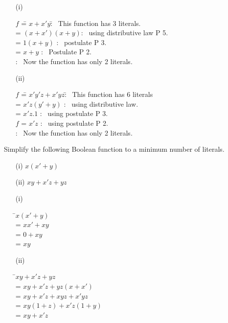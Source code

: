 \begin{solution}
\begin{itemize}
\item[(i)]
\begin{tabbing}
\phantom{AAAAAA}$f$ \== $x+x'y$\qquad\qquad \=:~ This function has 3 literals.\\[3pt]
 \>= $(x+x')(x+y)$\qquad \>:~ using distributive law P 5.\\[3pt]
 \>= $1(x+y)$ \>:~ postulate P 3.\\[3pt]
 \>= $x+y$    \>:~ Postulate P 2.\\[3pt]
 \>           \>:~ Now the function has only 2 literals.
\end{tabbing}

\item[(ii)] \begin{tabbing}
$f$ \== $x'y'z+x'yz$\qquad\qquad \=:~ This function has 6 literals\\[3pt]
    \>= $x'z(y'+y)$              \>:~ using distributive law.\\[3pt]
    \>= $x'z.1$                  \>:~ using postulate P 3.\\[3pt]
$f$ \>= $x'z$                    \>:~ using postulate P 2.\\[3pt]
    \>                           \>:~ Now the function has only 2 literals. 
\end{tabbing}
\end{itemize}
\end{solution}

\eject

\begin{problem}\label{prob5.55}
Simplify the following Boolean function to a minimum number of literals.
\begin{itemize}
\item[(i)] $x(x'+y)$

\item[(ii)] $xy+x'z+yz$
\end{itemize}
\end{problem}

\begin{solution}
\begin{itemize}
\item[(i)] 
\begin{tabbing}
\phantom{AAAAAA}\=\quad $x(x'+y)$\\[3pt]
\>= $xx'+xy$\\[3pt]
\>= $0+xy$\\[3pt]
\>= $xy$
\end{tabbing}

\item[(ii)] 
\begin{tabbing}
\=\quad $xy+x'z+yz$\\[3pt]
\>= $xy+x'z+yz(x+x')$\\[3pt]
\>= $xy+x'z+xyz+x'yz$\\[3pt]
\>= $xy(1+z)+x'z(1+y)$\\[3pt]
\>= $xy+x'z$
\end{tabbing}
\end{itemize}
\end{solution}

